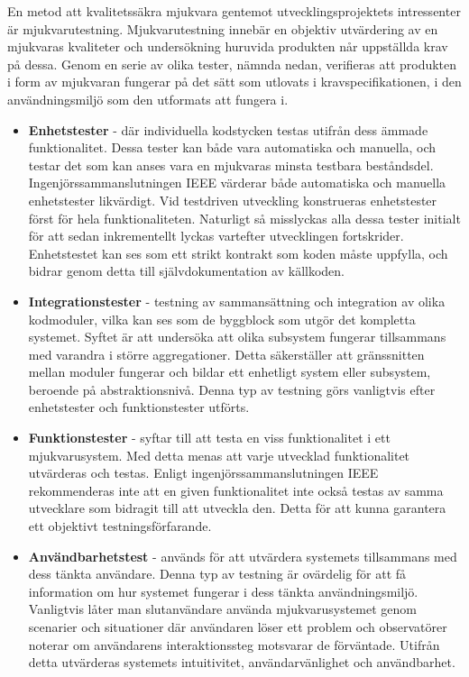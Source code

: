 En metod att kvalitetssäkra mjukvara gentemot utvecklingsprojektets intressenter är mjukvarutestning. Mjukvarutestning innebär en objektiv utvärdering av en mjukvaras kvaliteter och undersökning huruvida produkten når uppställda krav på dessa.\cite{book:artoftesting} Genom en serie av olika tester, nämnda nedan, verifieras att produkten i form av mjukvaran fungerar på det sätt som utlovats i kravspecifikationen, i den användningsmiljö som den utformats att fungera i.

\begin{itemize}
\item \textbf{Enhetstester} - där individuella kodstycken testas utifrån dess ämmade funktionalitet. Dessa tester kan både vara automatiska och manuella, och testar det som kan anses vara en mjukvaras minsta testbara beståndsdel. Ingenjörssammanslutningen IEEE värderar både automatiska och manuella enhetstester likvärdigt. Vid testdriven utveckling konstrueras enhetstester först för hela funktionaliteten. Naturligt så misslyckas alla dessa tester initialt för att sedan inkrementellt lyckas vartefter utvecklingen fortskrider. Enhetstestet kan ses som ett strikt kontrakt som koden måste uppfylla, och bidrar genom detta till självdokumentation av källkoden.\cite{ieee1008}
\item \textbf{Integrationstester} - testning av sammansättning och integration av olika kodmoduler, vilka kan ses som de byggblock som utgör det kompletta systemet. Syftet är att undersöka att olika subsystem fungerar tillsammans med varandra i större aggregationer. Detta säkerställer att gränssnitten mellan moduler fungerar och bildar ett enhetligt system eller subsystem, beroende på abstraktionsnivå. Denna typ av testning görs vanligtvis efter enhetstester och funktionstester utförts.\cite{integration_testing}
\item \textbf{Funktionstester} - syftar till att testa en viss funktionalitet i ett mjukvarusystem. Med detta menas att varje utvecklad funktionalitet utvärderas och testas. Enligt ingenjörssammanslutningen IEEE rekommenderas inte att en given funktionalitet inte också testas av samma utvecklare som bidragit till att utveckla den. Detta för att kunna garantera ett objektivt testningsförfarande. 
\item \textbf{Användbarhetstest} - används för att utvärdera systemets tillsammans med dess tänkta användare. Denna typ av testning är ovärdelig för att få information om hur systemet fungerar i dess tänkta användningsmiljö. Vanligtvis låter man slutanvändare använda mjukvarusystemet genom scenarier och situationer där användaren löser ett problem och observatörer noterar om användarens interaktionssteg motsvarar de förväntade. Utifrån detta utvärderas systemets intuitivitet, användarvänlighet och användbarhet. 

\end{itemize}
